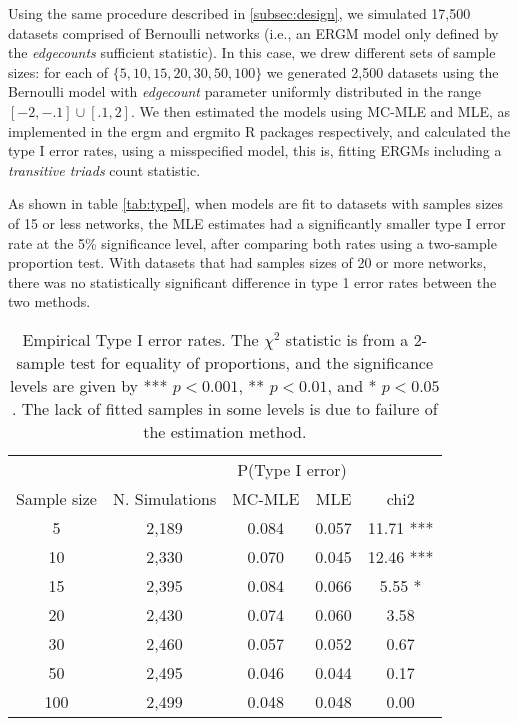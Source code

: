 \documentclass[12pt]{article}
\begin{document}
Using the same procedure described in \autoref{subsec:design}, we simulated 17,500 datasets comprised of Bernoulli networks (i.e., an ERGM model only defined by the \textit{edgecounts} sufficient statistic). In this case, we drew  different sets of sample sizes: for each of $\{5, 10, 15, 20, 30, 50, 100\}$ we generated 2,500 datasets using the Bernoulli model with \textit{edgecount} parameter uniformly distributed in the range $[-2, -.1]\cup [.1, 2]$. We then estimated the models using MC-MLE and MLE, as implemented in the ergm and ergmito R packages respectively, and calculated the type I error rates, using a misspecified model, this is, fitting ERGMs including a \textit{transitive triads} count statistic. 

As shown in table \autoref{tab:typeI}, when models are fit to datasets with samples sizes of 15 or less networks, the MLE estimates had a significantly smaller type I error rate at the 5\% significance level, after comparing both rates using a two-sample proportion test. With datasets that had samples sizes of 20 or more networks, there was no statistically significant difference in type 1 error rates between the two methods.

\begin{table}[ht]
	\centering
	\begin{tabular}{ccccc}
		\toprule & & \multicolumn{2}{c}{P(Type I error)} \\ \cmidrule(r){3-4}
		Sample size & N. Simulations & MC-MLE & MLE & chi2 \\ 
		\midrule
		5 & 2,189 & 0.084 & 0.057 & 11.71 *** \\ 
		10 & 2,330 & 0.070 & 0.045 & 12.46 *** \\ 
		15 & 2,395 & 0.084 & 0.066 & 5.55 * \\ 
		20 & 2,430 & 0.074 & 0.060 & 3.58  \\ 
		30 & 2,460 & 0.057 & 0.052 & 0.67  \\ 
		50 & 2,495 & 0.046 & 0.044 & 0.17  \\ 
		100 & 2,499 & 0.048 & 0.048 & 0.00  \\ 
		\bottomrule
	\end{tabular}
	\caption{\label{tab:typeI}Empirical Type I error rates. The $\chi^2$ statistic is from a 2-sample test for equality of proportions, and the significance levels are given by *** $p < 0.001$, ** $p < 0.01$, and * $p < 0.05$. The lack of fitted samples in some levels is due to failure of the estimation method.} 
\end{table}
\end{document}
